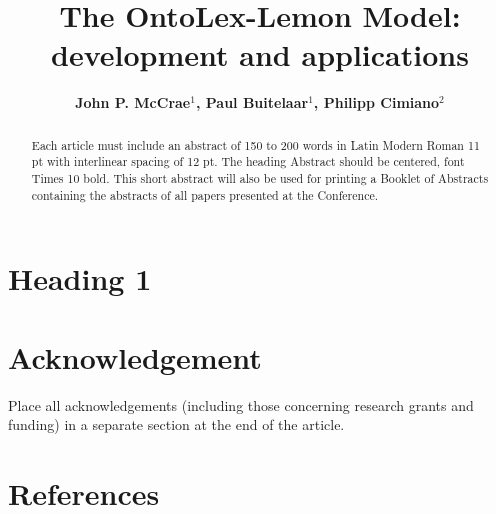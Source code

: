 \documentclass[12pt,a4paper]{elex2017}
\begin{document}
\mainmatter
\title{The OntoLex-Lemon Model: development and applications}
\author{\bf John P. McCrae$^1$, Paul Buitelaar$^1$, Philipp Cimiano$^{2}$}

\maketitle

\begin{abstract}
Each article must include an abstract of 150 to 200 words in Latin Modern Roman
11 pt with interlinear spacing of 12 pt. The heading Abstract should be
centered, font Times 10 bold. This short abstract will also be used for
printing a Booklet of Abstracts containing the abstracts of all papers
    presented at the Conference.~\cite{mccrae2009synonym}

\end{abstract}

\section{Heading 1}

\section{Acknowledgement} 

Place all acknowledgements (including those concerning research grants and
funding) in a separate section at the end of the article.

\section{References}

\printbibliography[
    type={book},
    notkeyword={dictionary},
    title={Books}
]
\printbibliography[
    type={incollection},
    title={Book Sections}
]
\printbibliography[
    type={inproceedings},
    title={Paper in conference proceedings}
]
\printbibliography[
    type={article},
    title={Journal Articles}
]
\printbibliography[
    type={misc},
    title={Web Sites and Other Resources}
]
\printbibliography[
    type={book},
    keyword={dictionary},
    title={Dictionaries}
]
\end{document}
